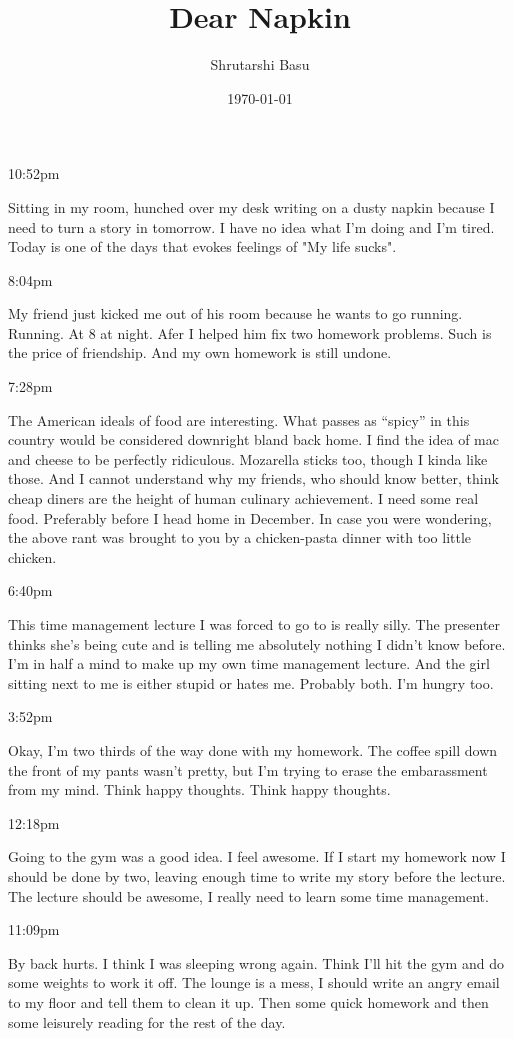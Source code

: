 \documentclass[11pt,letterpaper]{article}
\title{Dear Napkin}
\author{Shrutarshi Basu}
\date{\today}
\begin{document}
\maketitle
\doublespacing

10:52pm

Sitting in my room, hunched over my desk writing on a dusty napkin because I need to turn a story in tomorrow. I have no idea what I'm doing and I'm tired. Today is one of the days that evokes feelings of "My life sucks".

8:04pm

My friend just kicked me out of his room because he wants to go running. Running. At 8 at night. Afer I helped him fix two homework problems. Such is the price of friendship. And my own homework is still undone.

7:28pm

The American ideals of food are interesting. What passes as ``spicy'' in this country would be considered downright bland back home. I find the idea of mac and cheese to be perfectly ridiculous. Mozarella sticks too, though I kinda like those. And I cannot understand why my friends, who should know better, think cheap diners are the height of human culinary achievement. I need some real food. Preferably before I head home in December. In case you were wondering, the above rant was brought to you by a chicken-pasta dinner with too little chicken.

6:40pm

This time management lecture I was forced to go to is really silly. The presenter thinks she's being cute and is telling me absolutely nothing I didn't know before. I'm in half a mind to make up my own time management lecture. And the girl sitting next to me is either stupid or hates me. Probably both. I'm hungry too.

3:52pm

Okay, I'm two thirds of the way done with my homework. The coffee spill down the front of my pants wasn't pretty, but I'm trying to erase the embarassment from my mind. Think happy thoughts. Think happy thoughts.

12:18pm

Going to the gym was a good idea. I feel awesome. If I start my homework now I should be done by two, leaving enough time to write my story before the lecture. The lecture should be awesome, I really need to learn some time management.

11:09pm

By back hurts. I think I was sleeping wrong again. Think I'll hit the gym and do some weights to work it off. The lounge is a mess, I should write an angry email to my floor and tell them to clean it up. Then some quick homework and then some leisurely reading for the rest of the day.
\end{document}
